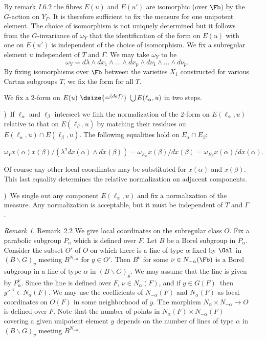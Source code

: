 \documentclass{memo-l}
\theoremstyle{definition}
\theoremstyle{remark}
\newtheorem{remark}[theorem]{Remark}
\numberwithin{section}{chapter}
\numberwithin{equation}{chapter}
\begin{document}
   By remark $I.6.2$ the fibres $E(u)$ and $E(u')$ are isomorphic (over
$\Fb$) by the $G$-action on $Y_{{\Gamma}}$.  It is therefore sufficient
to fix the measure for one unipotent element.  The choice of isomorphism is
not uniquely determined but it follows from the $G$-invariance of
${\omega}_{Y}$ that the identification of the form on $E(u)$ with one on
$E(u')$ is independent of the choice of isomorphism.  We fix a subregular
element $u$ independent of $T$ and ${\Gamma}$.  We may take ${\omega}_{Y}$
to be
$$
{\omega}_{Y}  =  d{\lambda}\wedge dx_{1}\wedge \ldots \wedge dx_{p}\wedge
d{\nu}_{1}\wedge \ldots \wedge d{\nu}_{p}.
$$
By fixing isomorphisms over $\Fb$ between the varieties $X_{1}$
constructed for various Cartan subgroups $T$, we fix the form for all $T$.
 

   We fix a $2$-form on $E(u)\ {\dsize{\mathrel{\mathop=^{(def)}}}}\ 
\bigcup E({\ell}_{{\alpha}},u)$ in two steps.

\medskip
{})\ If ${\ell}_{{\alpha}}$ and ${\ell}_{{\beta}}$ intersect we link the
normalization of the $2$-form on $E({\ell}_{{\alpha}},u)$ relative to that
on $E({\ell}_{{\beta}},u)$ by matching their residues on
$E({\ell}_{{\alpha}},u) \cap E({\ell}_{{\beta}},u)$.  The following
equalities hold on $E_{{\alpha}} \cap E_{{\beta}}$:

$$
{\omega}_{Y}x({\alpha})x({\beta})/({\lambda}^{2}dx({\alpha})\wedge
dx({\beta}))  =  {\omega}_{E_\alpha} x({\beta})/dx({\beta})  = 
{\omega}_{E_\beta} x({\alpha})/dx({\alpha}) .
$$
\enddefinition

\noindent Of course any other local coordinates may be substituted for $x({\alpha})$
and $x({\beta})$.  This last equality determines the relative normalization
on adjacent components.

\medskip
{})\ We single out any component $E({\ell}_{{\alpha}},u)$ and fix a
normalization of the measure.  Any normalization is acceptable, but it must
be independent of $T$ and ${\Gamma}$.

\begin{remark}{Remark\ 2.2} We give local coordinates on the subregular
class $O$.  Fix a parabolic subgroup $P_{{\alpha}}$ which is defined over
$F$.  Let $B$ be a Borel subgroup in $P_{{\alpha}}$.  Consider the subset
$O'$ of $O$ on which there is a line of type ${\alpha}$ fixed by $\Gal$ 
in $(B\backslash G)_{y}$ meeting $B^{N_{-{\alpha}}}$ for $y
\in O'$.  Then $B^{{\nu}}$ for some ${\nu} \in N_{-{\alpha}}(\Fb)$ 
is a Borel subgroup in a line of type ${\alpha}$ in $(B\backslash
G)_{y}$.  We may assume that the line is given by 
$P_{{\alpha}}^{{\nu}}$.  Since the line is defined over $F$, ${\nu} \in
N_{{\alpha}}(F)$, and if $y \in G(F)\ $ then  $y^{\nu^{-1}} \in
N_{{\alpha}}(F)$.  We may use the coefficients of $N_{-{\alpha}}(F)$ and
$N_{{\alpha}}(F)$ as local coordinates on $O(F)$ in some neighborhood of
$y$.  The morphism $N_{{\alpha}} \times N_{-{\alpha}} {\to} O$ is defined
over $F$.  Note that the number of points in $N_{{\alpha}}(F) \times
N_{-{\alpha}}(F)$ covering a given unipotent element $y$ depends on the
number of lines of type ${\alpha}$ in $(B\backslash G)_{y}$ meeting 
$B^{N_{-{\alpha}}}.$ 
\end{remark}
\end{document}
